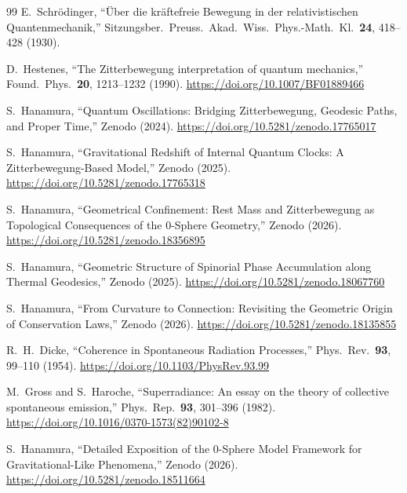 \documentclass[12pt,a4paper]{article}
\begin{document}
\begin{thebibliography}{99}
E.~Schr\"odinger,
``\"Uber die kr\"aftefreie Bewegung in der relativistischen Quantenmechanik,''
Sitzungsber.\ Preuss.\ Akad.\ Wiss.\ Phys.-Math.\ Kl.\ \textbf{24}, 418--428 (1930).

D.~Hestenes,
``The Zitterbewegung interpretation of quantum mechanics,''
Found.\ Phys.\ \textbf{20}, 1213--1232 (1990).
\href{https://doi.org/10.1007/BF01889466}{https://doi.org/10.1007/BF01889466}

S.~Hanamura,
``Quantum Oscillations: Bridging Zitterbewegung, Geodesic Paths, and Proper Time,''
Zenodo (2024).
\href{https://doi.org/10.5281/zenodo.17765017}{https://doi.org/10.5281/zenodo.17765017}

S.~Hanamura,
``Gravitational Redshift of Internal Quantum Clocks: A Zitterbewegung-Based Model,''
Zenodo (2025).
\href{https://doi.org/10.5281/zenodo.17765318}{https://doi.org/10.5281/zenodo.17765318}

S.~Hanamura,
``Geometrical Confinement: Rest Mass and Zitterbewegung as Topological Consequences of the 0-Sphere Geometry,''
Zenodo (2026).
\href{https://doi.org/10.5281/zenodo.18356895}{https://doi.org/10.5281/zenodo.18356895}

S.~Hanamura,
``Geometric Structure of Spinorial Phase Accumulation along Thermal Geodesics,''
Zenodo (2025).
\href{https://doi.org/10.5281/zenodo.18067760}{https://doi.org/10.5281/zenodo.18067760}

S.~Hanamura,
``From Curvature to Connection: Revisiting the Geometric Origin of Conservation Laws,''
Zenodo (2026).
\href{https://doi.org/10.5281/zenodo.18135855}{https://doi.org/10.5281/zenodo.18135855}

R.~H.~Dicke,
``Coherence in Spontaneous Radiation Processes,''
Phys.\ Rev.\ \textbf{93}, 99--110 (1954).
\href{https://doi.org/10.1103/PhysRev.93.99}{https://doi.org/10.1103/PhysRev.93.99}

M.~Gross and S.~Haroche,
``Superradiance: An essay on the theory of collective spontaneous emission,''
Phys.\ Rep.\ \textbf{93}, 301--396 (1982).
\href{https://doi.org/10.1016/0370-1573(82)90102-8}{https://doi.org/10.1016/0370-1573(82)90102-8}

S.~Hanamura,
``Detailed Exposition of the 0-Sphere Model Framework for Gravitational-Like Phenomena,''
Zenodo (2026).
\href{https://doi.org/10.5281/zenodo.18511664}{https://doi.org/10.5281/zenodo.18511664}


\end{thebibliography}
\end{document}

